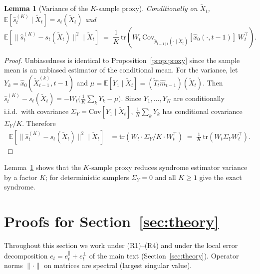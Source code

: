 \documentclass{article}
\theoremstyle{plain}
\newtheorem{lemma}[theorem]{Lemma}
\theoremstyle{definition}
\theoremstyle{remark}
\begin{document}
\begin{lemma}[Variance of the \(K\)-sample proxy]\label{lem:Ksample}
Conditionally on \(\tilde X_t\),
\(\mathbb{E}[\hat s_t^{(K)} \mid \tilde X_t] = s_t(\tilde X_t)\) and
\begin{equation}
\mathbb{E}\!\left[\|\hat s_t^{(K)} - s_t(\tilde X_t)\|^2 \mid \tilde X_t\right]
\;=\;
\frac{1}{K}\,\mathrm{tr}\!\left(W_t\,\mathrm{Cov}_{\tilde p_{t-1\mid t}(\cdot\mid\tilde X_t)}[\hat x_0(\cdot,t-1)]\,W_t^\top\right).
\label{eq:Ksample_var}
\end{equation}
\end{lemma}

\begin{proof}
Unbiasedness is identical to Proposition~\ref{prop:proxy} since the sample
mean is an unbiased estimator of the conditional mean. For the variance,
let \(Y_k = \hat x_0(\tilde X_{t-1}^{(k)}, t-1)\) and
\(\mu = \mathbb{E}[Y_1 \mid \tilde X_t] = (\tilde T_t\hat m_{t-1})(\tilde
X_t)\). Then
\(\hat s_t^{(K)} - s_t(\tilde X_t) = -W_t\bigl(\tfrac1K\sum_k Y_k -
\mu\bigr)\). Since \(Y_1,\dots,Y_K\) are conditionally i.i.d.\ with
covariance \(\Sigma_Y = \mathrm{Cov}[Y_1 \mid \tilde X_t]\),
\(\tfrac1K\sum_k Y_k\) has conditional covariance \(\Sigma_Y/K\). Therefore
\begin{align*}
\mathbb{E}\!\left[\|\hat s_t^{(K)} - s_t(\tilde X_t)\|^2 \mid \tilde X_t\right]
&= \mathrm{tr}\!\left(W_t \cdot \Sigma_Y/K \cdot W_t^\top\right)
\;=\; \tfrac1K\,\mathrm{tr}(W_t \Sigma_Y W_t^\top).
\end{align*}
\end{proof}

Lemma~\ref{lem:Ksample} shows that the \(K\)-sample proxy reduces syndrome
estimator variance by a factor \(K\); for deterministic samplers \(\Sigma_Y=0\)
and all \(K\ge 1\) give the exact syndrome.

\section{Proofs for Section~\ref{sec:theory}}
\label{app:thm_proofs}

Throughout this section we work under (R1)--(R4) and under the local error
decomposition \(e_t = e_t^\parallel + e_t^\perp\) of the main text
(Section~\ref{sec:theory}). Operator norms \(\|\cdot\|\) on matrices are
spectral (largest singular value).

\end{document}
